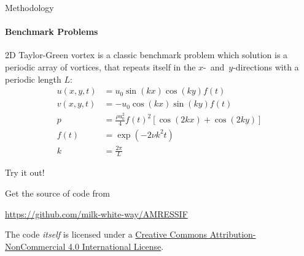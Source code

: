 \documentclass{beamer}
\begin{document}
\begin{frame}{Methodology}
	\framesubtitle{Benchmark Problems}
	
	2D Taylor-Green vortex is a classic benchmark problem which solution is a periodic array of vortices, that repeats itself in the $x$- and $y$-directions with a periodic length $L$:
	\begin{align}
		u(x,y,t) &= u_0 \sin(kx) \cos(ky) f(t) \\
		v(x,y,t) &= - u_0 \cos(kx) \sin(ky) f(t) \\
		p &= \frac{\rho u_0^2}{4} f(t)^2 \left[ \cos(2kx) + \cos(2ky) \right] \\
		f(t) &= \exp{(-2 \nu k^2 t)} \\
		k &= \frac{2\pi}{L}
	\end{align}
	
\end{frame}

\begin{frame}{Try it out!}

  \begin{block}{Get the source of code from}

  \begin{center}\url{https://github.com/milk-white-way/AMRESSIF}\end{center}

  \end{block}
  
  The code \emph{itself} is licensed under a
  \href{https://creativecommons.org/licenses/by-nc/4.0/}{Creative Commons
  Attribution-NonCommercial 4.0 International License}.

  \begin{center}\ccbync\end{center}

\end{frame}
\end{document}
